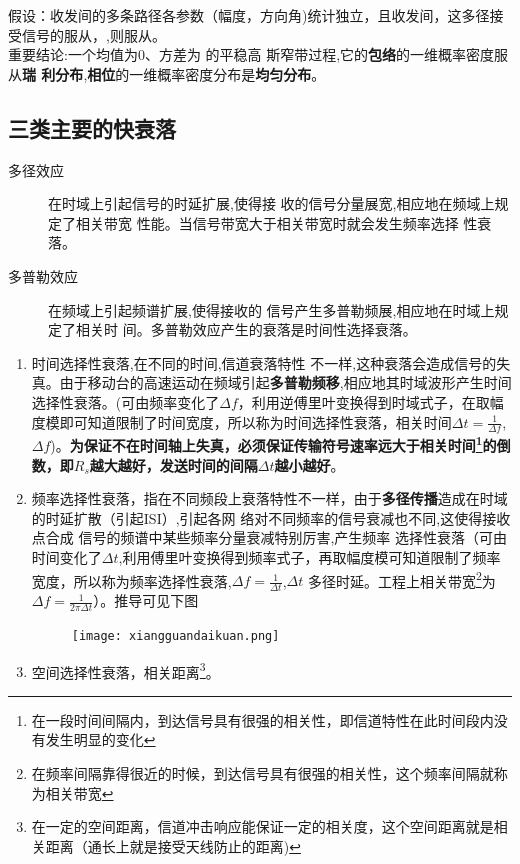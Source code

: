 假设：收发间的多条路径各参数（幅度，方向角)统计独立，且收发间{}，这多径接受信号的{}服从{}，{},则服从{}。\\
重要结论:一个均值为0、方差为 的平稳高
斯窄带过程,它的\textbf{包络}的一维概率密度服从\textbf{瑞
利分布},\textbf{相位}的一维概率密度分布是\textbf{均匀分布}。
\subsection{三类主要的快衰落
}
\begin{description}
	\item[多径效应] 在时域上引起信号的时延扩展,使得接
	收的信号分量展宽,相应地在频域上规定了相关带宽
	性能。当信号带宽大于相关带宽时就会发生频率选择
	性衰落。
	\item[多普勒效应] 在频域上引起频谱扩展,使得接收的
	信号产生多普勒频展,相应地在时域上规定了相关时
	间。多普勒效应产生的衰落是时间性选择衰落。
\end{description}
\begin{enumerate}
	\item 时间选择性衰落,在不同的时间,信道衰落特性
	不一样,这种衰落会造成信号的失真。由于移动台的高速运动在频域引起\textbf{多普勒频移},相应地其时域波形产生时间选择性衰落。(可由频率变化了$\Delta f$，利用逆傅里叶变换得到时域式子，在取幅度模即可知道限制了时间宽度，所以称为时间选择性衰落，相关时间$\Delta t = \frac{1}{\Delta f}$,$\Delta f${\color{red}{基带信号带宽})}。\textbf{为保证不在时间轴上失真，必须保证传输符号速率远大于相关时间\footnote{在一段时间间隔内，到达信号具有很强的相关性，即信道特性在此时间段内没有发生明显的变化}的倒数，即$R_s$越大越好，发送时间的间隔$\Delta t$越小越好}。
	\item 频率选择性衰落，指在不同频段上衰落特性不一样，由于\textbf{多径传播}造成在时域的时延扩散（引起ISI）,引起各网
	络对不同频率的信号衰减也不同,这使得接收点合成
	信号的频谱中某些频率分量衰减特别厉害,产生频率
	选择性衰落（可由时间变化了$\Delta t$,利用傅里叶变换得到频率式子，再取幅度模可知道限制了频率宽度，所以称为频率选择性衰落,$\Delta f = \frac{1}{\Delta t}$,$\Delta t$ 多径时延。工程上相关带宽\footnote{在频率间隔靠得很近的时候，到达信号具有很强的相关性，这个频率间隔就称为相关带宽}为$\Delta f = \frac{1}{2\pi \Delta t}$）。推导可见下图
	{
		\begin{figure}[h!]
			\centering
			\texttt{[image: xiangguandaikuan.png]}
			\caption{}
			\label{fig:}
		\end{figure}
		
}
	\item 空间选择性衰落，相关距离\footnote{在一定的空间距离，信道冲击响应能保证一定的相关度，这个空间距离就是相关距离（通长上就是接受天线防止的距离)}。
\end{enumerate}
